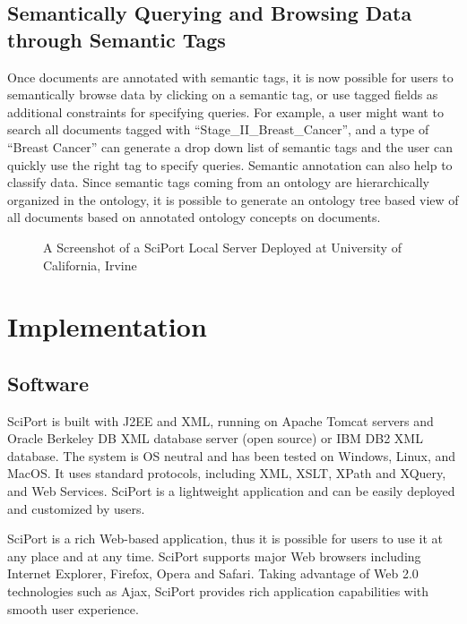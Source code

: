 \documentclass{singlecol-new}
\theoremstyle{TH}{
\newtheorem{lemma}{Lemma}
\newtheorem{theorem}[lemma]{Theorem}
\newtheorem{corrolary}[lemma]{Corrolary}
\newtheorem{conjecture}[lemma]{Conjecture}
\newtheorem{proposition}[lemma]{Proposition}
\newtheorem{claim}[lemma]{Claim}
\newtheorem{stheorem}[lemma]{Wrong Theorem}
\newtheorem{algorithm}{Algorithm}
}
\theoremstyle{THrm}{
\newtheorem{definition}{Definition}[section]
\newtheorem{question}{Question}[section]
\newtheorem{remark}{Remark}
\newtheorem{scheme}{Scheme}
}
\theoremstyle{THhit}{
\newtheorem{case}{Case}[section]
}
\begin{document}
\subsection{Semantically Querying and Browsing Data through Semantic Tags}

Once documents are annotated with semantic tags, it is now possible
for users to semantically browse data by clicking on a semantic tag,
or use tagged fields as additional constraints for specifying
queries.  For example, a user might want to  search all documents
tagged with ``Stage\_II\_Breast\_Cancer'', and a type of ``Breast
Cancer'' can generate a drop down list of semantic tags and the user
can quickly use the right tag to specify queries.  Semantic
annotation can also help to classify data. Since semantic tags
coming from an ontology are hierarchically organized in the
ontology,  it is possible to generate an ontology tree based view of
all documents based on annotated ontology concepts on documents.

\begin{figure*}[t] \center %
\caption{A Screenshot of a SciPort Local Server Deployed at
University of California, Irvine} \label{sciportfrontpage}
\end{figure*}


\section{Implementation}

\subsection{Software}

SciPort is built with J2EE and XML, running on Apache Tomcat servers
and Oracle Berkeley DB XML database server (open source) or IBM DB2
XML database. The system is OS neutral and has been tested on
Windows, Linux, and MacOS. It uses standard protocols, including
XML, XSLT, XPath and XQuery, and Web Services. SciPort is a
lightweight application and can be easily deployed and customized
by users.

SciPort is a rich Web-based application, thus it is possible for
users to use it at any place and at any time. SciPort supports major
Web browsers including Internet Explorer, Firefox, Opera and Safari.
Taking advantage of Web 2.0 technologies such as Ajax, SciPort
provides rich application capabilities with smooth user experience.
\end{document}
